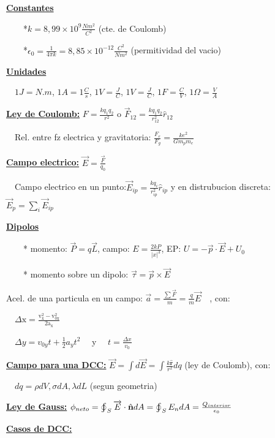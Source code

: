 \documentclass[12pt]{article}
\begin{document}
\textbf{\underline{Constantes}}

$\qquad${*}$k=8,99\times10^{9}\frac{Nm^{2}}{C^{2}}$ (cte. de Coulomb)

$\qquad${*}$\epsilon_{0}=$$\frac{1}{4\pi k}=8,85\times10^{-12}\frac{C^{2}}{Nm^{2}}$
(permitividad del vacio)

\textbf{\underline{Unidades}}

$\quad$$1J=N.m$, $1A=1\frac{C}{s}$, $1V=\frac{J}{C}$, $1V=\frac{J}{C}$, $1F=\frac{C}{V}$, $1\Omega=\frac{V}{A}$

\textbf{\underline{Ley de Coulomb:}} $F=\frac{kq_{1}q_{2}}{r^{2}}$ o $\overrightarrow{F}_{12}=\frac{kq_{1}q_{2}}{r_{12}^{2}}\hat{r}_{12}$

$\quad$Rel. entre fz electrica y gravitatoria: $\frac{F_{e}}{F_{g}}=\frac{ke^{2}}{Gm_{p}m_{e}}$

\textbf{\underline{Campo electrico:}} $\overrightarrow{E}=\frac{\overrightarrow{F}}{q_{0}}$

$\quad$Campo electrico en un punto:$\overrightarrow{E}_{ip}=\frac{kq_{i}}{r_{ip}^{2}}\hat{r}_{ip}$
y en distrubucion discreta: $\overrightarrow{E}_{p}=\underset{i}{\sum}\overrightarrow{E}_{ip}$

\textbf{\underline{Dipolos}}

$\qquad${*} momento: $\overrightarrow{P}=q\overrightarrow{L}$, campo: $E=\frac{2kP}{\left|x\right|^{3}}$,
EP: $U=-\overrightarrow{p}\cdot\overrightarrow{E}+U_{0}$ 

$\qquad${*} momento sobre un dipolo: $\overrightarrow{\tau}=\overrightarrow{p}\times\overrightarrow{E}$

Acel. de una particula en un campo: $\overrightarrow{a}=\frac{\sum\overrightarrow{F}}{m}=\frac{q}{m}\overrightarrow{E}\quad$, con: 

$\quad\mathrm{\varDelta x=\frac{v_{x}^{2}-v_{0x}^{2}}{2a_{x}}}$

$\quad\varDelta y=v_{0y}t+\frac{1}{2}a_{y}t^{2}\quad$ y$\quad$ $t=\frac{\varDelta x}{v_{0}}$

\textbf{\underline{Campo para una DCC:}} $\overrightarrow{E}=\int d\overrightarrow{E}=\int\frac{k\mathbf{\hat{r}}}{r^{2}}dq$
(ley de Coulomb), con:

$\quad dq=\rho dV,\sigma dA,\lambda dL$ (segun geometria)

\textbf{\underline{Ley de Gauss:}} $\phi_{neto}=\varoint_{S}\overrightarrow{E}\cdot\hat{\mathbf{n}}dA=\varoint_{S}E_{n}dA=\frac{Q_{interior}}{\epsilon_{0}}$

\textbf{\underline{Casos de DCC:}}
\end{document}
